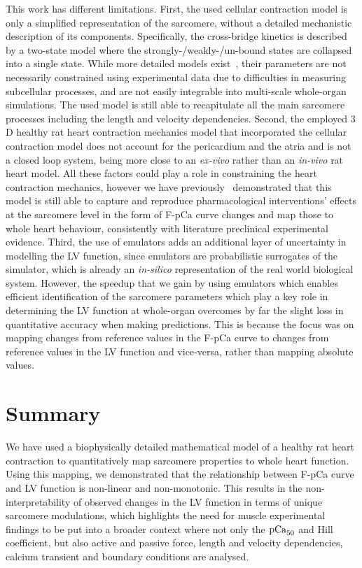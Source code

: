 \noindent
This work has different limitations. First, the used cellular contraction model is only a simplified representation of the sarcomere, without a detailed mechanistic description of its components. Specifically, the cross-bridge kinetics is described by a two-state model where the strongly-/weakly-/un-bound states are collapsed into a single state. While more detailed models exist~\cite{Land:2015}, their parameters are not necessarily constrained using experimental data due to difficulties in measuring subcellular processes, and are not easily integrable into multi-scale whole-organ simulations. The used model is still able to recapitulate all the main sarcomere processes including the length and velocity dependencies. Second, the employed $3$D healthy rat heart contraction mechanics model that incorporated the cellular contraction model does not account for the pericardium and the atria and is not a closed loop system, being more close to an \textit{ex-vivo} rather than an \textit{in-vivo} rat heart model. All these factors could play a role in constraining the heart contraction mechanics, however we have previously~\cite{Longobardi:2021} demonstrated that this model is still able to capture and reproduce pharmacological interventions' effects at the sarcomere level in the form of F-pCa curve changes and map those to whole heart behaviour, consistently with literature preclinical experimental evidence. Third, the use of emulators adds an additional layer of uncertainty in modelling the LV function, since emulators are probabilistic surrogates of the simulator, which is already an \textit{in-silico} representation of the real world biological system. However, the speedup that we gain by using emulators which enables efficient identification of the sarcomere parameters which play a key role in determining the LV function at whole-organ overcomes by far the slight loss in quantitative accuracy when making predictions. This is because the focus was on mapping changes from reference values in the F-pCa curve to changes from reference values in the LV function and vice-versa, rather than mapping absolute values.


%
%
%
\section{Summary}\label{sec:ch8summary}
 We have used a biophysically detailed mathematical model of a healthy rat heart contraction to quantitatively map sarcomere properties to whole heart function. Using this mapping, we demonstrated that the relationship between F-pCa curve and LV function is non-linear and non-monotonic. This results in the non-interpretability of observed changes in the LV function in terms of unique sarcomere modulations, which highlights the need for muscle experimental findings to be put into a broader context where not only the $\textrm{pCa}_{50}$ and Hill coefficient, but also active and passive force, length and velocity dependencies, calcium transient and boundary conditions are analysed.